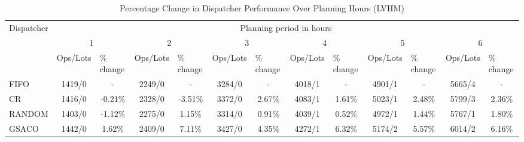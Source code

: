 \begin{table}[]
	\caption{Percentage Change in Dispatcher Performance Over Planning Hours (LVHM)}\label{tab:dispatchers-LVHM}
	\begin{tabular}{|l|cccccccccccc|}
		\hline
		\multirow{3}{*}{Dispatcher} &
		\multicolumn{12}{c|}{Planning period in hours} \\ \cline{2-13} 
		&
		\multicolumn{2}{c|}{1} &
		\multicolumn{2}{c|}{2} &
		\multicolumn{2}{c|}{3} &
		\multicolumn{2}{c|}{4} &
		\multicolumn{2}{c|}{5} &
		\multicolumn{2}{c|}{6} \\ \cline{2-13} 
		&
		\multicolumn{1}{l|}{Ops/Lots} &
		\multicolumn{1}{l|}{\% change} &
		\multicolumn{1}{l|}{Ops/Lots} &
		\multicolumn{1}{l|}{\% change} &
		\multicolumn{1}{l|}{Ops/Lots} &
		\multicolumn{1}{l|}{\% change} &
		\multicolumn{1}{l|}{Ops/Lots} &
		\multicolumn{1}{l|}{\% change} &
		\multicolumn{1}{l|}{Ops/Lots} &
		\multicolumn{1}{l|}{\% change} &
		\multicolumn{1}{l|}{Ops/Lots} &
		\multicolumn{1}{l|}{\% change} \\ \hline
		FIFO &
		\multicolumn{1}{c|}{1419/0} &
		\multicolumn{1}{c|}{-} &
		\multicolumn{1}{c|}{2249/0} &
		\multicolumn{1}{c|}{-} &
		\multicolumn{1}{c|}{3284/0} &
		\multicolumn{1}{c|}{-} &
		\multicolumn{1}{c|}{4018/1} &
		\multicolumn{1}{c|}{-} &
		\multicolumn{1}{c|}{4901/1} &
		\multicolumn{1}{c|}{-} &
		\multicolumn{1}{c|}{5665/4} &
		- \\
		CR &
		\multicolumn{1}{c|}{1416/0} &
		\multicolumn{1}{c|}{-0.21\%} &
		\multicolumn{1}{c|}{2328/0} &
		\multicolumn{1}{c|}{-3.51\%} &
		\multicolumn{1}{c|}{3372/0} &
		\multicolumn{1}{c|}{2.67\%} &
		\multicolumn{1}{c|}{4083/1} &
		\multicolumn{1}{c|}{1.61\%} &
		\multicolumn{1}{c|}{5023/1} &
		\multicolumn{1}{c|}{2.48\%} &
		\multicolumn{1}{c|}{5799/3} &
		2.36\% \\
		RANDOM &
		\multicolumn{1}{c|}{1403/0} &
		\multicolumn{1}{c|}{-1.12\%} &
		\multicolumn{1}{c|}{2275/0} &
		\multicolumn{1}{c|}{1.15\%} &
		\multicolumn{1}{c|}{3314/0} &
		\multicolumn{1}{c|}{0.91\%} &
		\multicolumn{1}{c|}{4039/1} &
		\multicolumn{1}{c|}{0.52\%} &
		\multicolumn{1}{c|}{4972/1} &
		\multicolumn{1}{c|}{1.44\%} &
		\multicolumn{1}{c|}{5767/1} &
		1.80\% \\
		GSACO &
		\multicolumn{1}{c|}{1442/0} &
		\multicolumn{1}{c|}{1.62\%} &
		\multicolumn{1}{c|}{2409/0} &
		\multicolumn{1}{c|}{7.11\%} &
		\multicolumn{1}{c|}{3427/0} &
		\multicolumn{1}{c|}{4.35\%} &
		\multicolumn{1}{c|}{4272/1} &
		\multicolumn{1}{c|}{6.32\%} &
		\multicolumn{1}{c|}{5174/2} &
		\multicolumn{1}{c|}{5.57\%} &
		\multicolumn{1}{c|}{6014/2} &
		6.16\% \\ \hline
	\end{tabular}%
\end{table}

